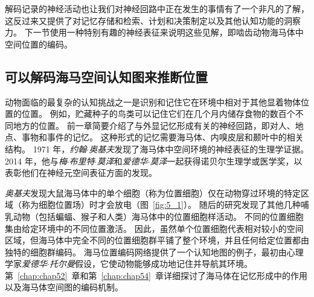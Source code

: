 解码记录的神经活动也让我们对神经回路中正在发生的事情有了一个非凡的了解，这反过来又提供了对记忆存储和检索、计划和决策制定以及其他认知功能的洞察力。
下一节使用一种特别有趣的神经表征来说明这些见解，即啮齿动物海马体中空间位置的编码。


\subsection{可以解码海马空间认知图来推断位置}

动物面临的最复杂的认知挑战之一是识别和记住它在环境中相对于其他显着物体位置的位置。
例如，贮藏种子的鸟类可以记住它们在几个月内储存食物的数百个不同地方的位置。
前一章简要介绍了与外显记忆形成有关的神经回路，即对人、地点、事物和事件的记忆。
这种形式的记忆需要海马体、内嗅皮层和颞叶中的相关结构。
1971 年，\textit{约翰$\cdot$奥基夫}发现了海马体中空间环境的神经表征的生理学证据。
2014 年，他与\textit{梅$\cdot$布里特$\cdot$莫泽}和\textit{爱德华$\cdot$莫泽}一起获得诺贝尔生理学或医学奖，以表彰他们在神经元空间表征方面的发现。


\textit{奥基夫}发现大鼠海马体中的单个细胞（称为位置细胞）仅在动物穿过环境的特定区域（称为细胞位置场）时才会放电（图~\ref{fig:5_1}）。
随后的研究发现了其他几种哺乳动物（包括蝙蝠、猴子和人类）海马体中的位置细胞样活动。
不同的位置细胞集由给定环境中的不同位置激活。
因此，虽然单个位置细胞代表相对较小的空间区域，但海马体中完全不同的位置细胞群平铺了整个环境，并且任何给定位置都由独特的细胞群编码。
海马位置编码网络提供了一个认知地图的例子，最初由心理学家\textit{爱德华$\cdot$托尔曼}假设，它使动物能够成功地记住并导航其环境。
第~\ref{chap:chap52}~章和第~\ref{chap:chap54}~章详细探讨了海马体在记忆形成中的作用以及海马体空间图的编码机制。


